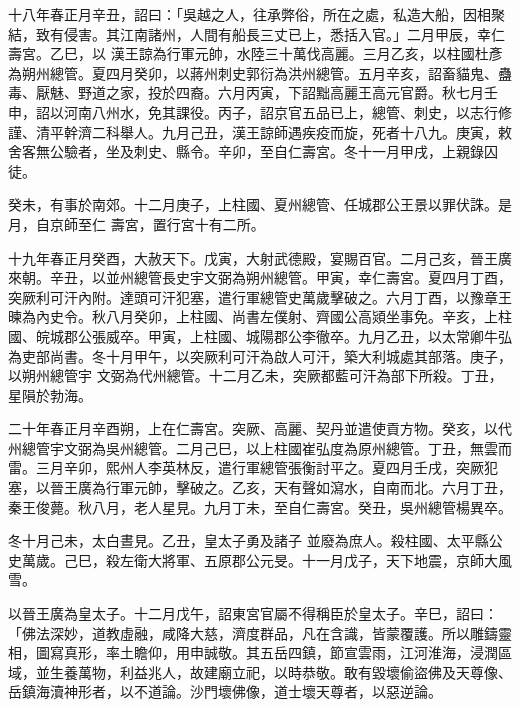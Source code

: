 \begin{pinyinscope}
 十八年春正月辛丑，詔曰：「吳越之人，往承弊俗，所在之處，私造大船，因相聚結，致有侵害。其江南諸州，人間有船長三丈已上，悉括入官。」二月甲辰，幸仁壽宮。乙巳，以
 漢王諒為行軍元帥，水陸三十萬伐高麗。三月乙亥，以柱國杜彥為朔州總管。夏四月癸卯，以蔣州刺史郭衍為洪州總管。五月辛亥，詔畜貓鬼、蠱毒、厭魅、野道之家，投於四裔。六月丙寅，下詔黜高麗王高元官爵。秋七月壬申，詔以河南八州水，免其課役。丙子，詔京官五品已上，總管、刺史，以志行修謹、清平幹濟二科舉人。九月己丑，漢王諒師遇疾疫而旋，死者十八九。庚寅，敕舍客無公驗者，坐及刺史、縣令。辛卯，至自仁壽宮。冬十一月甲戌，上親錄囚徒。



 癸未，有事於南郊。十二月庚子，上柱國、夏州總管、任城郡公王景以罪伏誅。是月，自京師至仁
 壽宮，置行宮十有二所。



 十九年春正月癸酉，大赦天下。戊寅，大射武德殿，宴賜百官。二月己亥，晉王廣來朝。辛丑，以並州總管長史宇文弼為朔州總管。甲寅，幸仁壽宮。夏四月丁酉，突厥利可汗內附。達頭可汗犯塞，遣行軍總管史萬歲擊破之。六月丁酉，以豫章王暕為內史令。秋八月癸卯，上柱國、尚書左僕射、齊國公高熲坐事免。辛亥，上柱國、皖城郡公張威卒。甲寅，上柱國、城陽郡公李徹卒。九月乙丑，以太常卿牛弘為吏部尚書。冬十月甲午，以突厥利可汗為啟人可汗，築大利城處其部落。庚子，以朔州總管宇
 文弼為代州總管。十二月乙未，突厥都藍可汗為部下所殺。丁丑，星隕於勃海。



 二十年春正月辛酉朔，上在仁壽宮。突厥、高麗、契丹並遣使貢方物。癸亥，以代州總管宇文弼為吳州總管。二月己巳，以上柱國崔弘度為原州總管。丁丑，無雲而雷。三月辛卯，熙州人李英林反，遣行軍總管張衡討平之。夏四月壬戌，突厥犯塞，以晉王廣為行軍元帥，擊破之。乙亥，天有聲如瀉水，自南而北。六月丁丑，秦王俊薨。秋八月，老人星見。九月丁未，至自仁壽宮。癸丑，吳州總管楊異卒。



 冬十月己未，太白晝見。乙丑，皇太子勇及諸子
 並廢為庶人。殺柱國、太平縣公史萬歲。己巳，殺左衛大將軍、五原郡公元旻。十一月戊子，天下地震，京師大風雪。



 以晉王廣為皇太子。十二月戊午，詔東宮官屬不得稱臣於皇太子。辛巳，詔曰：「佛法深妙，道教虛融，咸降大慈，濟度群品，凡在含識，皆蒙覆護。所以雕鑄靈相，圖寫真形，率土瞻仰，用申誠敬。其五岳四鎮，節宣雲雨，江河淮海，浸潤區域，並生養萬物，利益兆人，故建廟立祀，以時恭敬。敢有毀壞偷盜佛及天尊像、岳鎮海瀆神形者，以不道論。沙門壞佛像，道士壞天尊者，以惡逆論。




\end{pinyinscope}
